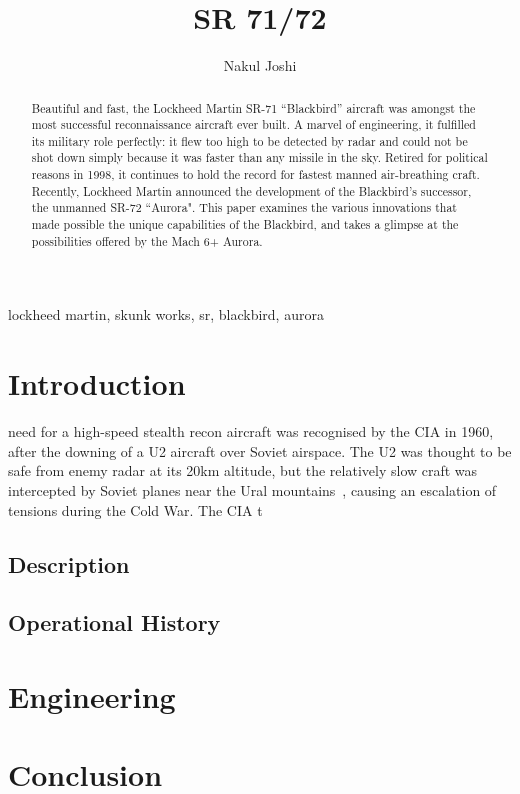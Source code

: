 \documentclass[]{IEEEtran}
\title{SR 71/72}
\author{Nakul Joshi}
\begin{document}
\maketitle

\begin{abstract}

	Beautiful and fast, the Lockheed Martin SR-71 ``Blackbird'' aircraft was amongst the most successful reconnaissance aircraft ever built. A marvel of engineering, it fulfilled its military role perfectly: it flew too high to be detected by radar and could not be shot down simply because it was faster than any missile in the sky. Retired for political reasons in 1998, it continues to hold the record for fastest manned air-breathing craft. Recently, Lockheed Martin announced the development of the Blackbird's successor, the unmanned SR-72 ``Aurora". This paper examines the various innovations that made possible the unique capabilities of the Blackbird, and takes a glimpse at the possibilities offered by the Mach 6+ Aurora.

\end{abstract}\begin{IEEEkeywords}

lockheed martin, skunk works, sr, blackbird, aurora

\end{IEEEkeywords}


\section{Introduction}
	 need for a high-speed stealth recon aircraft was recognised by the CIA in 1960, after the downing of a U2 aircraft over Soviet airspace. The U2 was thought to be safe from enemy radar at its 20km altitude, but the relatively slow craft was intercepted by Soviet planes near the Ural mountains~\cite{u2}, causing an escalation of tensions during the Cold War. The CIA t
	
	\subsection{Description}

	\subsection{Operational History}
	
	
\section{Engineering}

\section{Conclusion}

\nocite{*}
{}

\end{document}

